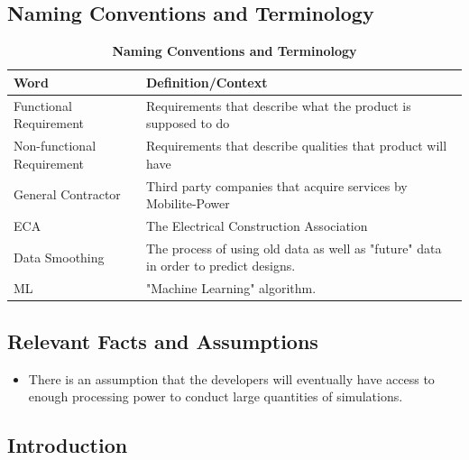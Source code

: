 \documentclass[12pt, titlepage]{article}
\begin{document}
\subsection{Naming Conventions and Terminology}

\begin{table}[H]
\caption{\bf Naming Conventions and Terminology}
\begin{tabular}{ |p{6cm}|p{8cm}|  } 
 \hline
\bf Word & \bf Definition/Context\\
 \hline
 Functional Requirement & Requirements that describe what the product is supposed to do\\
 \hline
Non-functional Requirement & Requirements that describe qualities that product will have\\
 \hline
General Contractor & Third party companies that acquire services by Mobilite-Power\\
  \hline
ECA & The Electrical Construction Association\\
\hline
Data Smoothing & The process of using old data as well as "future" data in order to predict designs.\\
\hline
ML & "Machine Learning" algorithm.\\
\hline
\end{tabular}
\end{table}

\subsection{Relevant Facts and Assumptions}
\begin{itemize}
    \item There is an assumption that the developers will eventually have access to enough processing power to conduct large quantities of simulations.

\end{itemize}

\subsection{Introduction}
\end{document}
